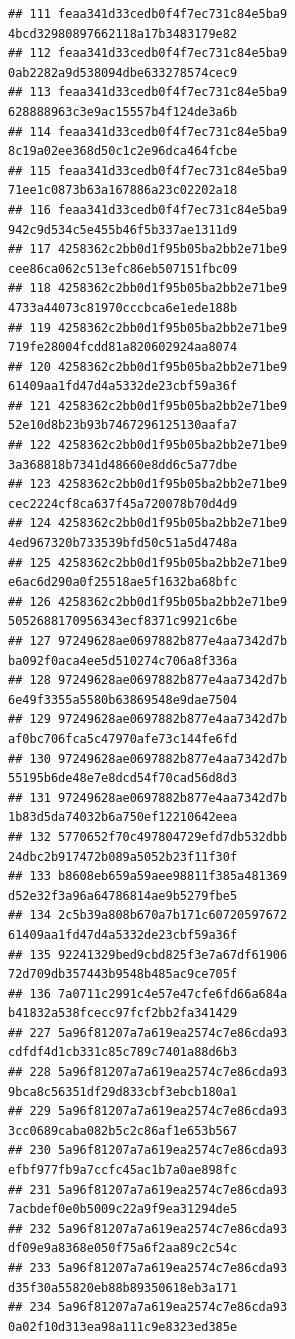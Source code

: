 \documentclass[]{article}
\begin{document}
\begin{verbatim}
## 111 feaa341d33cedb0f4f7ec731c84e5ba9     4bcd32980897662118a17b3483179e82
## 112 feaa341d33cedb0f4f7ec731c84e5ba9     0ab2282a9d538094dbe633278574cec9
## 113 feaa341d33cedb0f4f7ec731c84e5ba9     628888963c3e9ac15557b4f124de3a6b
## 114 feaa341d33cedb0f4f7ec731c84e5ba9     8c19a02ee368d50c1c2e96dca464fcbe
## 115 feaa341d33cedb0f4f7ec731c84e5ba9     71ee1c0873b63a167886a23c02202a18
## 116 feaa341d33cedb0f4f7ec731c84e5ba9     942c9d534c5e455b46f5b337ae1311d9
## 117 4258362c2bb0d1f95b05ba2bb2e71be9     cee86ca062c513efc86eb507151fbc09
## 118 4258362c2bb0d1f95b05ba2bb2e71be9     4733a44073c81970cccbca6e1ede188b
## 119 4258362c2bb0d1f95b05ba2bb2e71be9     719fe28004fcdd81a820602924aa8074
## 120 4258362c2bb0d1f95b05ba2bb2e71be9     61409aa1fd47d4a5332de23cbf59a36f
## 121 4258362c2bb0d1f95b05ba2bb2e71be9     52e10d8b23b93b7467296125130aafa7
## 122 4258362c2bb0d1f95b05ba2bb2e71be9     3a368818b7341d48660e8dd6c5a77dbe
## 123 4258362c2bb0d1f95b05ba2bb2e71be9     cec2224cf8ca637f45a720078b70d4d9
## 124 4258362c2bb0d1f95b05ba2bb2e71be9     4ed967320b733539bfd50c51a5d4748a
## 125 4258362c2bb0d1f95b05ba2bb2e71be9     e6ac6d290a0f25518ae5f1632ba68bfc
## 126 4258362c2bb0d1f95b05ba2bb2e71be9     5052688170956343ecf8371c9921c6be
## 127 97249628ae0697882b877e4aa7342d7b     ba092f0aca4ee5d510274c706a8f336a
## 128 97249628ae0697882b877e4aa7342d7b     6e49f3355a5580b63869548e9dae7504
## 129 97249628ae0697882b877e4aa7342d7b     af0bc706fca5c47970afe73c144fe6fd
## 130 97249628ae0697882b877e4aa7342d7b     55195b6de48e7e8dcd54f70cad56d8d3
## 131 97249628ae0697882b877e4aa7342d7b     1b83d5da74032b6a750ef12210642eea
## 132 5770652f70c497804729efd7db532dbb     24dbc2b917472b089a5052b23f11f30f
## 133 b8608eb659a59aee98811f385a481369     d52e32f3a96a64786814ae9b5279fbe5
## 134 2c5b39a808b670a7b171c60720597672     61409aa1fd47d4a5332de23cbf59a36f
## 135 92241329bed9cbd825f3e7a67df61906     72d709db357443b9548b485ac9ce705f
## 136 7a0711c2991c4e57e47cfe6fd66a684a     b41832a538fcecc97fcf2bb2fa341429
## 227 5a96f81207a7a619ea2574c7e86cda93     cdfdf4d1cb331c85c789c7401a88d6b3
## 228 5a96f81207a7a619ea2574c7e86cda93     9bca8c56351df29d833cbf3ebcb180a1
## 229 5a96f81207a7a619ea2574c7e86cda93     3cc0689caba082b5c2c86af1e653b567
## 230 5a96f81207a7a619ea2574c7e86cda93     efbf977fb9a7ccfc45ac1b7a0ae898fc
## 231 5a96f81207a7a619ea2574c7e86cda93     7acbdef0e0b5009c22a9f9ea31294de5
## 232 5a96f81207a7a619ea2574c7e86cda93     df09e9a8368e050f75a6f2aa89c2c54c
## 233 5a96f81207a7a619ea2574c7e86cda93     d35f30a55820eb88b89350618eb3a171
## 234 5a96f81207a7a619ea2574c7e86cda93     0a02f10d313ea98a111c9e8323ed385e

\end{verbatim}
\end{document}
